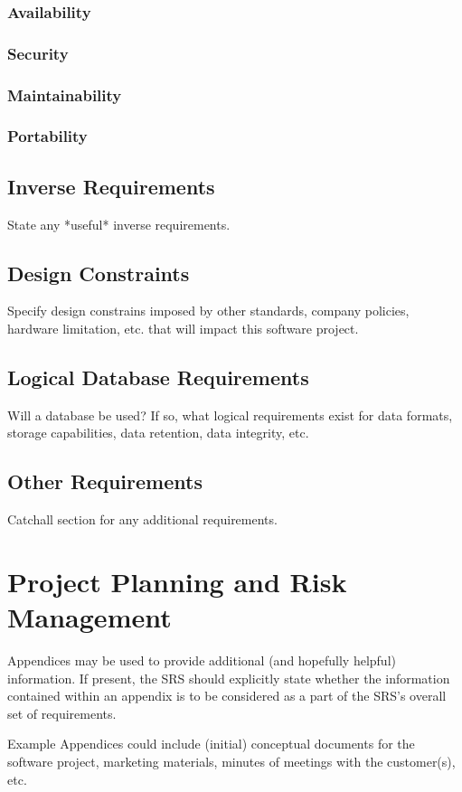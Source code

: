 \documentclass[titlepage]{article}
\begin{document}
\subsubsection{Availability}

\subsubsection{Security}

\subsubsection{Maintainability}

\subsubsection{Portability}

\subsection{Inverse Requirements}
State any *useful* inverse requirements.

\subsection{Design Constraints}
Specify design constrains imposed by other standards, company policies, hardware limitation, etc. that will impact this software project.

\subsection{Logical Database Requirements}
Will a database be used?  If so, what logical requirements exist for data formats, storage capabilities, data retention, data integrity, etc.

\subsection{Other Requirements}
Catchall section for any additional requirements.

\section{Project Planning and Risk Management}

\begin{appendices}
Appendices may be used to provide additional (and hopefully helpful) information.  If present, the SRS should explicitly state whether the information contained within an appendix is to be considered as a part of the SRS’s overall set of requirements.

Example Appendices could include (initial) conceptual documents for the software project, marketing materials, minutes of meetings with the customer(s), etc.
\end{appendices}
\end{document}
